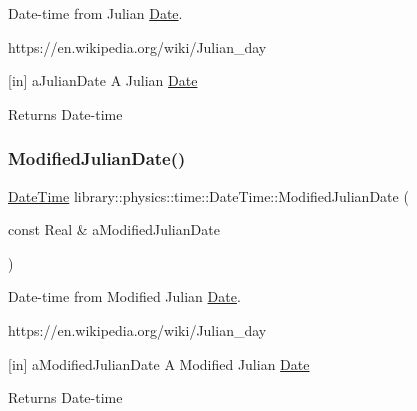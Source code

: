 Date-\/time from Julian \hyperlink{classlibrary_1_1physics_1_1time_1_1_date}{Date}. 

https\+://en.wikipedia.\+org/wiki/\+Julian\+\_\+day

\mbox{[}in\mbox{]} a\+Julian\+Date A Julian \hyperlink{classlibrary_1_1physics_1_1time_1_1_date}{Date} \begin{DoxyReturn}{Returns}
Date-\/time 
\end{DoxyReturn}
\mbox{\label{classlibrary_1_1physics_1_1time_1_1_date_time_aa403adb642d299481fda591b93553bbc}} 
\subsubsection{\texorpdfstring{Modified\+Julian\+Date()}{ModifiedJulianDate()}}
{\footnotesize\ttfamily \hyperlink{classlibrary_1_1physics_1_1time_1_1_date_time}{Date\+Time} library\+::physics\+::time\+::\+Date\+Time\+::\+Modified\+Julian\+Date (\begin{DoxyParamCaption}\item[{const Real \&}]{a\+Modified\+Julian\+Date }\end{DoxyParamCaption})\hspace{0.3cm}{\ttfamily [static]}}



Date-\/time from Modified Julian \hyperlink{classlibrary_1_1physics_1_1time_1_1_date}{Date}. 

https\+://en.wikipedia.\+org/wiki/\+Julian\+\_\+day

\mbox{[}in\mbox{]} a\+Modified\+Julian\+Date A Modified Julian \hyperlink{classlibrary_1_1physics_1_1time_1_1_date}{Date} \begin{DoxyReturn}{Returns}
Date-\/time 
\end{DoxyReturn}
\mbox{\label{classlibrary_1_1physics_1_1time_1_1_date_time_a7aecc9cd84e3d197165b1486c0b63c64}} 
